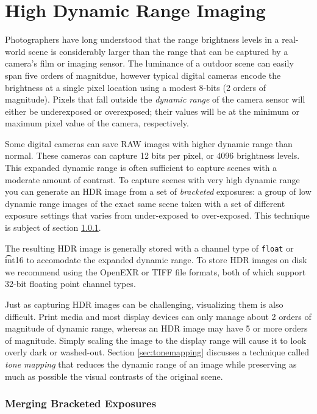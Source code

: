 \chapter{High Dynamic Range Imaging}

Photographers have long understood that the range brightness levels in
a real-world scene is considerably larger than the range that can be
captured by a camera's film or imaging sensor.  The luminance of a
outdoor scene can easily span five orders of magnitdue, however
typical digital cameras encode the brightness at a single pixel
location using a modest 8-bits (2 orders of magnitude).  Pixels that
fall outside the {\em dynamic range} of the camera sensor will either
be underexposed or overexposed; their values will be at the minimum or
maximum pixel value of the camera, respectively.

Some digital cameras can save RAW images with higher dynamic range
than normal.  These cameras can capture 12 bits per pixel, or 4096
brightness levels.  This expanded dynamic range is often sufficient to
capture scenes with a moderate amount of contrast. To capture scenes
with very high dynamic range you can generate an HDR image from a set
of {\em bracketed} exposures: a group of low dynamic range images of
the exact same scene taken with a set of different exposure settings
that varies from under-exposed to over-exposed.  This technique is
subject of section \ref{sec:hdr_merge}.  

The resulting HDR image is generally stored with a channel type of
{\tt float} or {\t int16} to accomodate the expanded dynamic range.
To store HDR images on disk we recommend using the OpenEXR or TIFF
file formats, both of which support 32-bit floating point channel
types.

Just as capturing HDR images can be challenging, visualizing them is
also difficult.  Print media and most display devices can only manage
about 2 orders of magnitude of dynamic range, whereas an HDR image may
have 5 or more orders of magnitude. Simply scaling the image to the
display range will cause it to look overly dark or washed-out. Section
\ref{sec:tonemapping} discusses a technique called {\em tone mapping}
that reduces the dynamic range of an image while preserving as much as
possible the visual contrasts of the original scene.

\subsection{Merging Bracketed Exposures}
\label{sec:hdr_merge}

